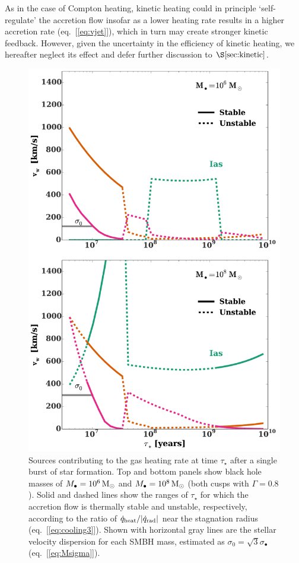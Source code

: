 \documentclass[usenatbib,fleqn]{mn2e}
\newcommand{\Mbh}[1][]{M_{\bullet#1}}
\begin{document}
As in the case of Compton heating, kinetic heating could in principle
`self-regulate' the accretion flow insofar as a lower heating rate
results in a higher accretion rate (eq.~[\ref{eq:vjet}]), which in
turn may create stronger kinetic feedback.  However, given the uncertainty
in the efficiency of kinetic heating, we hereafter neglect its effect and defer further discussion
to $\S\ref{sec:kinetic}$.


\begin{figure}
\includegraphics[width=\columnwidth]{vwSourcesImp.pdf}
\caption{\label{fig:vwSourcesImp} Sources contributing to
  the gas heating rate at time $\tau_{\star}$ after
  a single burst of star formation.  Top and bottom panels show black hole masses of $\Mbh=10^6 \Msun$ and $\Mbh= 10^8 \Msun$
  (both cusps with $\Gamma=0.8$).  Solid and dashed lines show the ranges of
  $\tau_{\star}$ for which the accretion flow is thermally stable and
  unstable, respectively, according to the ratio of $\dot{q}_{\rm
    heat}/|\dot{q}_{\rm rad}|$ near the stagnation radius
  (eq.~[\ref{eq:cooling3}]).  Shown with horizontal gray lines
  are the stellar velocity dispersion for each SMBH mass, estimated as $\sigma_0=\sqrt{3} \sigma_{\bullet}$ (eq.~[\ref{eq:Msigma}]).}
\end{figure}
\end{document}
